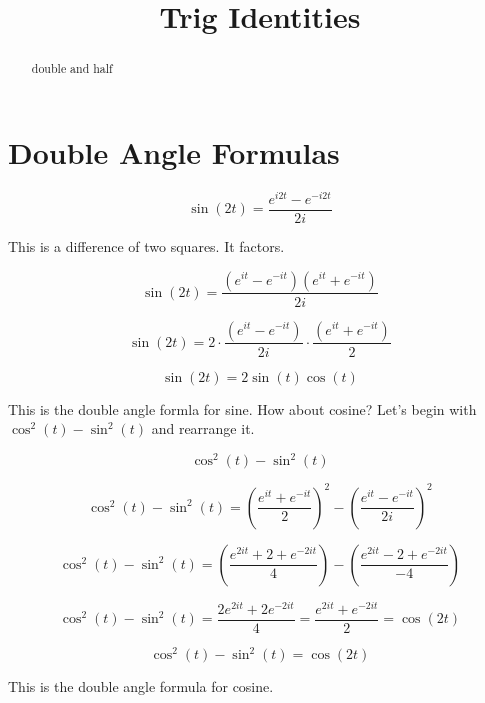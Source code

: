 \documentclass{ximera}
\title{Trig Identities}
\begin{document}
\begin{abstract}
double and half
\end{abstract}
\maketitle






\section{Double Angle Formulas}


\[   \sin(2t) = \frac{e^{i 2t} - e^{-i 2t}}{2 i}      \]


This is a difference of two squares.  It factors.



\[   \sin(2t) = \frac{(e^{i t} - e^{-i t})(e^{i t} + e^{-i t})}{2 i}      \]




\[   \sin(2t) = 2 \cdot \frac{(e^{i t} - e^{-i t})}{2i}    \cdot    \frac{(e^{i t} + e^{-i t})}{2}      \]



\[   \sin(2t) = 2 \sin(t)   \cos(t)      \]

This is the double angle formla for sine.  How about cosine?
Let's begin with $\cos^2(t) - \sin^2(t)$ and rearrange it.











\[      \cos^2(t) - \sin^2(t)      \]



\[      \cos^2(t) - \sin^2(t)   = \left( \frac{e^{i t} + e^{-i t}}{2} \right)^2 - \left( \frac{e^{i t} - e^{-i t}}{2i} \right)^2  \]


\[      \cos^2(t) - \sin^2(t)   = \left( \frac{e^{2i t} + 2 + e^{-2i t}}{4} \right) - \left( \frac{e^{2 i t} - 2 + e^{-2i t}}{-4} \right)  \]



\[      \cos^2(t) - \sin^2(t)   = \frac{2 e^{2i t}  + 2 e^{-2i t}}{4}   = \frac{e^{2i t}  + e^{-2i t}}{2} = \cos(2t)   \]




\[      \cos^2(t) - \sin^2(t)  = \cos(2t)    \]


This is the double angle formula for cosine. \\
\end{document}
